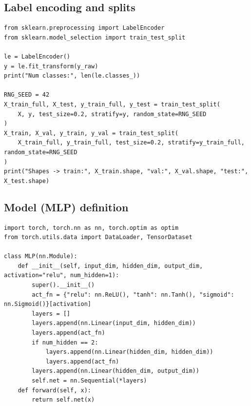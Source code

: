 \documentclass[11pt,a4paper]{article}
\begin{document}
\subsection{Label encoding and splits}
\begin{lstlisting}[caption={Label encoding and train/val/test split}]
from sklearn.preprocessing import LabelEncoder
from sklearn.model_selection import train_test_split

le = LabelEncoder()
y = le.fit_transform(y_raw)
print("Num classes:", len(le.classes_))

RNG_SEED = 42
X_train_full, X_test, y_train_full, y_test = train_test_split(
    X, y, test_size=0.2, stratify=y, random_state=RNG_SEED
)
X_train, X_val, y_train, y_val = train_test_split(
    X_train_full, y_train_full, test_size=0.2, stratify=y_train_full, random_state=RNG_SEED
)
print("Shapes -> train:", X_train.shape, "val:", X_val.shape, "test:", X_test.shape)
\end{lstlisting}

\subsection{Model (MLP) definition}
\begin{lstlisting}[caption={MLP model class (PyTorch)}]
import torch, torch.nn as nn, torch.optim as optim
from torch.utils.data import DataLoader, TensorDataset

class MLP(nn.Module):
    def __init__(self, input_dim, hidden_dim, output_dim, activation="relu", num_hidden=1):
        super().__init__()
        act_fn = {"relu": nn.ReLU(), "tanh": nn.Tanh(), "sigmoid": nn.Sigmoid()}[activation]
        layers = []
        layers.append(nn.Linear(input_dim, hidden_dim))
        layers.append(act_fn)
        if num_hidden == 2:
            layers.append(nn.Linear(hidden_dim, hidden_dim))
            layers.append(act_fn)
        layers.append(nn.Linear(hidden_dim, output_dim))
        self.net = nn.Sequential(*layers)
    def forward(self, x):
        return self.net(x)
\end{lstlisting}
\end{document}
